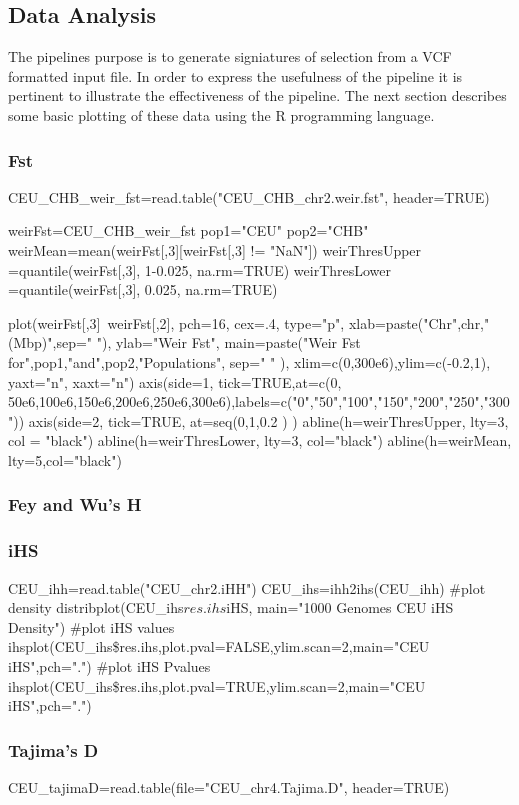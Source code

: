 \documentclass[a4paper,10pt]{article}
\begin{document}
\subsection{Data Analysis}
The pipelines purpose is to generate signiatures of selection from a VCF formatted input file. In order to express the usefulness of the pipeline it is pertinent to illustrate the effectiveness of the pipeline. The next section describes some basic plotting of these data using the R programming language.
\subsubsection{Fst}
CEU\_CHB\_weir\_fst=read.table("CEU\_CHB\_chr2.weir.fst", header=TRUE)

weirFst=CEU\_CHB\_weir\_fst
pop1="CEU"
pop2="CHB"
weirMean=mean(weirFst[,3][weirFst[,3] != "NaN"])
weirThresUpper =quantile(weirFst[,3], 1-0.025, na.rm=TRUE)
weirThresLower =quantile(weirFst[,3], 0.025, na.rm=TRUE)
         
plot(weirFst[,3]~weirFst[,2], pch=16, cex=.4, type="p", xlab=paste("Chr",chr,"(Mbp)",sep=" "), ylab="Weir Fst", main=paste("Weir Fst for",pop1,"and",pop2,"Populations", sep=" " ), xlim=c(0,300e6),ylim=c(-0.2,1), yaxt="n", xaxt="n")
axis(side=1, tick=TRUE,at=c(0, 50e6,100e6,150e6,200e6,250e6,300e6),labels=c("0","50","100","150","200","250","300"))
axis(side=2, tick=TRUE, at=seq(0,1,0.2 ) )
abline(h=weirThresUpper, lty=3, col = "black")
abline(h=weirThresLower, lty=3, col="black")
abline(h=weirMean, lty=5,col="black")



\subsubsection{Fey and Wu's H}
\subsubsection{iHS}
CEU\_ihh=read.table("CEU\_chr2.iHH")
CEU\_ihs=ihh2ihs(CEU\_ihh)
#plot density
distribplot(CEU\_ihs$res.ihs$iHS, main="1000 Genomes CEU iHS Density")
#plot iHS values
ihsplot(CEU\_ihs\$res.ihs,plot.pval=FALSE,ylim.scan=2,main="CEU iHS",pch=".")
#plot iHS Pvalues
ihsplot(CEU\_ihs\$res.ihs,plot.pval=TRUE,ylim.scan=2,main="CEU iHS",pch=".")


\subsubsection{Tajima's D}
CEU\_tajimaD=read.table(file="CEU\_chr4.Tajima.D", header=TRUE)
\end{document}
